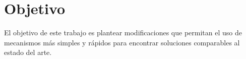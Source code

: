 \section{Objetivo}

El objetivo de este trabajo es plantear modificaciones que permitan el uso de mecanismos más simples y rápidos para encontrar soluciones comparables al estado del arte.


